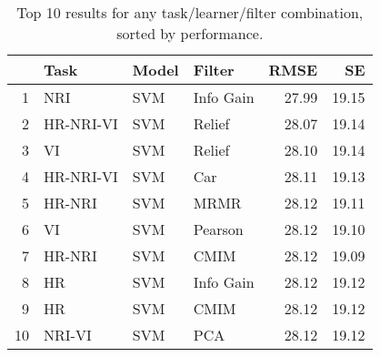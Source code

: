\begin{table}[ht!]
\centering
\caption{Top 10 results for any task/learner/filter combination, sorted by performance.} 
\label{tab:perf-top-10}
\begin{tabular}{rlllrr}
  \hline
 & Task & Model & Filter & RMSE & SE \\ 
  \hline
1 & NRI & SVM & Info Gain & 27.99 & 19.15 \\ 
  2 & HR-NRI-VI & SVM & Relief & 28.07 & 19.14 \\ 
  3 & VI & SVM & Relief & 28.10 & 19.14 \\ 
  4 & HR-NRI-VI & SVM & Car & 28.11 & 19.13 \\ 
  5 & HR-NRI & SVM & MRMR & 28.12 & 19.11 \\ 
  6 & VI & SVM & Pearson & 28.12 & 19.10 \\ 
  7 & HR-NRI & SVM & CMIM & 28.12 & 19.09 \\ 
  8 & HR & SVM & Info Gain & 28.12 & 19.12 \\ 
  9 & HR & SVM & CMIM & 28.12 & 19.12 \\ 
  10 & NRI-VI & SVM & PCA & 28.12 & 19.12 \\ 
   \hline
\end{tabular}
\end{table}
